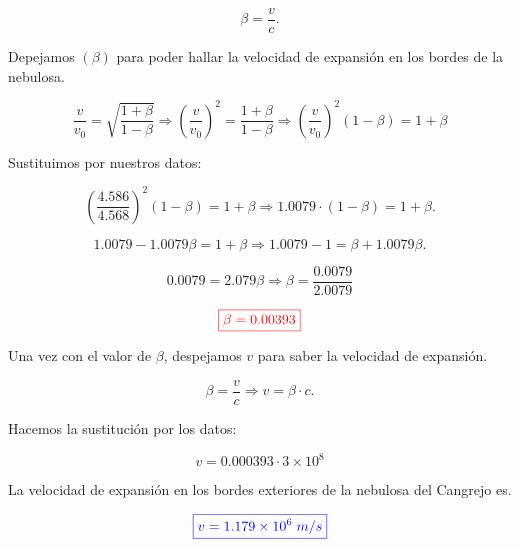 \documentclass[a4paper,12pt]{article} %
\begin{document}
\[ \beta = \frac{v}{c}. \]

\vspace{\baselineskip}

\begin{justify}
    Depejamos \((\beta) \) para poder hallar la velocidad de expansión en los bordes de la nebulosa.
\end{justify}

\[ \frac{v}{v_0} = \sqrt{\frac{1 + \beta}{1- \beta}} \Rightarrow \left(\frac{v}{v_0}\right)^2 = \frac{1 + \beta}{1- \beta} \Rightarrow \left(\frac{v}{v_0}\right)^2 \left(1- \beta\right) = 1 + \beta \]

\vspace{\baselineskip}

\begin{justify}
    Sustituimos por nuestros datos:
\end{justify}

\[ \left(\frac{4.586}{4.568}\right)^2 \left(1 - \beta\right) = 1 + \beta \Rightarrow 1.0079 \cdot \left( 1 - \beta \right) = 1 + \beta. \]

\vspace{\baselineskip}

\[ 1.0079 - 1.0079\beta = 1 + \beta \Rightarrow 1.0079 - 1 = \beta + 1.0079\beta. \]

\[ 0.0079 = 2.079\beta \Rightarrow \beta = \frac{0.0079}{2.0079} \]

\[\textcolor{red}{\boxed{\beta = 0.00393}}\]

\vspace{\baselineskip}

\begin{justify}
    Una vez con el valor de \(\beta\), despejamos \(v\) para saber la velocidad de expansión.
\end{justify}

\[  \beta = \frac{v}{c} \Rightarrow v = \beta \cdot c .\]

\begin{justify}
    Hacemos la sustitución por los datos:
\end{justify}

\[ v = 0.000393 \cdot 3 \times 10^8 \]

\begin{justify}
    La velocidad de expansión en los bordes exteriores de la nebulosa del Cangrejo es.
\end{justify}

\[ \textcolor{blue}{\boxed{v = 1.179 \times 10^6 \; m/s}}\]
\end{document}
